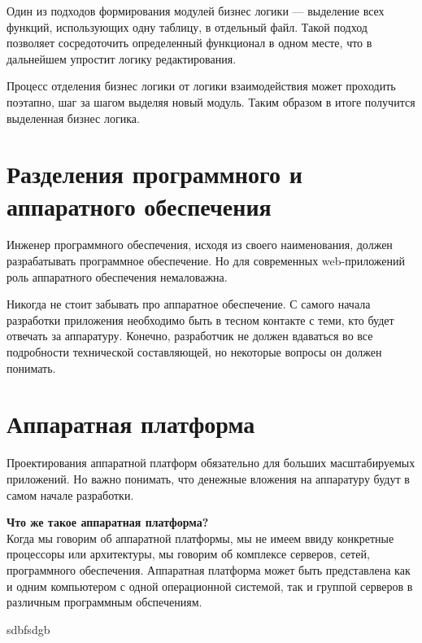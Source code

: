 Один из подходов формирования модулей бизнес логики --- выделение всех функций, использующих одну таблицу, в отдельный файл. Такой подход позволяет сосредоточить определенный функционал в одном месте, что в дальнейшем упростит логику редактирования.

Процесс отделения бизнес логики от логики взаимодействия может проходить поэтапно, шаг за шагом выделяя новый модуль. Таким образом в итоге получится выделенная бизнес логика.


\section{ Разделения программного и аппаратного обеспечения } \label{sect2_5}

Инженер программного обеспечения, исходя из своего наименования, должен разрабатывать программное обеспечение. Но для современных web-приложений роль аппаратного обеспечения немаловажна.

Никогда не стоит забывать про аппаратное обеспечение. С самого начала разработки приложения необходимо быть в тесном контакте с теми, кто будет отвечать за аппаратуру. Конечно, разработчик не должен вдаваться во все подробности технической составляющей, но некоторые вопросы он должен понимать.


\section{ Аппаратная платформа } \label{sect2_6}

Проектирования аппаратной платформ обязательно для больших масштабируемых приложений. Но важно понимать, что денежные вложения на аппаратуру будут в самом начале разработки. 

\begin{center}
\begin{minipage}
{0.8\textwidth} 
\textbf{Что же такое аппаратная платформа?}\\
Когда мы говорим об аппаратной платформы, мы не имеем ввиду конкретные процессоры или архитектуры, мы говорим об комплексе серверов, сетей,  программного обеспечения. Аппаратная платформа может быть представлена как и одним компьютером с одной операционной системой, так и группой серверов в различным программным обспечениям.
\end{minipage}
\end{center}

sdbfsdgb






















\clearpage


